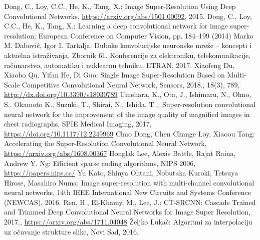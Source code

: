 \documentclass[12pt]{report}
\numberwithin{equation}{section}
\begin{document}





\begin{thebibliography}{10}

 Dong, C., Loy, C.C., He, K., Tang, X.: Image Super-Resolution Using Deep Convolutional Networks, \url{https://arxiv.org/abs/1501.00092}, 2015.
 Dong, C., Loy, C.C., He, K., Tang, X.: Learning a deep convolutional network for image super-resolution; European Conference on Computer Vision, pp. 184–199 (2014)
 Marko M. Dabović, Igor I. Tartalja: Duboke konvolucijske neuronske mreže – koncepti i aktuelna istraživanja, Zbornik 61. Konferencije za elektroniku, telekomunikacije, računarstvo, automatiku i nuklearnu tehniku, ETRAN, 2017.
 Xiaofeng Du, Xiaobo Qu, Yifan He, Di Guo: Single Image Super-Resolution Based on Multi-Scale Competitive Convolutional Neural Network, Sensors, 2018., 18(3), 789, \url{http://dx.doi.org/10.3390/s18030789}
 Umehara, K., Ota, J., Ishimaru, N., Ohno, S., Okamoto K., Suzuki, T., Shirai, N., Ishida, T.,: Super-resolution convolutional neural network for the improvement of the image quality of magnified images in chest radiographs, SPIE Medical Imaging, 2017, \url{https://doi.org/10.1117/12.2249969}
 Chao Dong, Chen Change Loy, Xiaoou Tang: Accelerating the Super-Resolution Convolutional Neural Network, \url{https://arxiv.org/abs/1608.00367}
 Honglak Lee, Alexis Battle, Rajat Raina, Andrew Y. Ng: Efficient sparse coding algorithms, NIPS 2006, \url{https://papers.nips.cc/}
 Yu Kato, Shinya Ohtani, Nobutaka Kuroki, Tetsuya Hirose, Masahiro Numa: Image super-resolution with multi-channel convolutional neural networks, 14th IEEE International New Circuits and Systems Conference (NEWCAS), 2016.
  Ren, H., El-Khamy, M., Lee, J.: CT-SRCNN: Cascade Trained and Trimmed Deep Convolutional Neural Networks for Image Super Resolution, 2017., \url{https://arxiv.org/abs/1711.04048}
 Željko Lukač: Algoritmi za interpolaciju uz očuvanje strukture slike, Novi Sad, 2016. 


\end{thebibliography}
\end{document}
